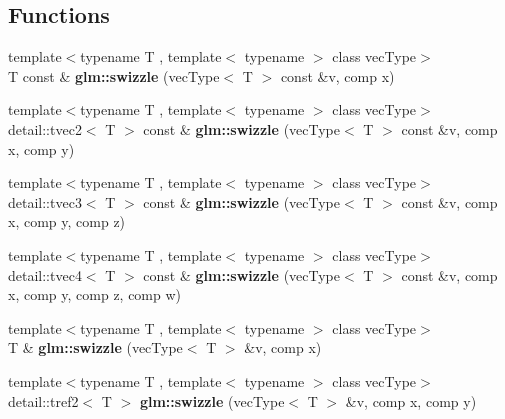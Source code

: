\subsection*{Functions}
\begin{DoxyCompactItemize}
\item 
\hypertarget{group__gtc__swizzle_ga09b6f795bc75d7fa47085a715eb636c9}{}{\footnotesize template$<$typename T , template$<$ typename $>$ class vec\+Type$>$ }\\T const \& {\bfseries glm\+::swizzle} (vec\+Type$<$ T $>$ const \&v, comp x)\label{group__gtc__swizzle_ga09b6f795bc75d7fa47085a715eb636c9}

\item 
\hypertarget{group__gtc__swizzle_ga9eba89cade1f01221e5f4dc019b00245}{}{\footnotesize template$<$typename T , template$<$ typename $>$ class vec\+Type$>$ }\\detail\+::tvec2$<$ T $>$ const \& {\bfseries glm\+::swizzle} (vec\+Type$<$ T $>$ const \&v, comp x, comp y)\label{group__gtc__swizzle_ga9eba89cade1f01221e5f4dc019b00245}

\item 
\hypertarget{group__gtc__swizzle_gabf0ce6dc9ee0b7d6327e211760bb9d20}{}{\footnotesize template$<$typename T , template$<$ typename $>$ class vec\+Type$>$ }\\detail\+::tvec3$<$ T $>$ const \& {\bfseries glm\+::swizzle} (vec\+Type$<$ T $>$ const \&v, comp x, comp y, comp z)\label{group__gtc__swizzle_gabf0ce6dc9ee0b7d6327e211760bb9d20}

\item 
\hypertarget{group__gtc__swizzle_ga54740b832c0d65da8ca7c682d50f4ae5}{}{\footnotesize template$<$typename T , template$<$ typename $>$ class vec\+Type$>$ }\\detail\+::tvec4$<$ T $>$ const \& {\bfseries glm\+::swizzle} (vec\+Type$<$ T $>$ const \&v, comp x, comp y, comp z, comp w)\label{group__gtc__swizzle_ga54740b832c0d65da8ca7c682d50f4ae5}

\item 
\hypertarget{group__gtc__swizzle_gac4d0759e0f966baa98e69133c781bc9d}{}{\footnotesize template$<$typename T , template$<$ typename $>$ class vec\+Type$>$ }\\T \& {\bfseries glm\+::swizzle} (vec\+Type$<$ T $>$ \&v, comp x)\label{group__gtc__swizzle_gac4d0759e0f966baa98e69133c781bc9d}

\item 
\hypertarget{group__gtc__swizzle_gaff724836e02c36bf40441f5fae116b53}{}{\footnotesize template$<$typename T , template$<$ typename $>$ class vec\+Type$>$ }\\detail\+::tref2$<$ T $>$ {\bfseries glm\+::swizzle} (vec\+Type$<$ T $>$ \&v, comp x, comp y)\label{group__gtc__swizzle_gaff724836e02c36bf40441f5fae116b53}


\end{DoxyCompactItemize}
